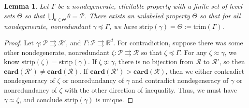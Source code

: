 \documentclass[12pt]{article}
\newcommand{\reals}{\mathbb{R}}
\renewcommand{\P}{\mathcal{P}}
\newcommand{\R}{\mathcal{R}}
\newcommand{\toto}{\rightrightarrows}
\newcommand{\strip}{\mathrm{strip}}
\newcommand{\card}{\textbf{card}}
\newtheorem{lemma}{Lemma}
\begin{document}
\begin{lemma}\label{lem:define-trim}
	Let $\Gamma$  be a nondegenerate, elicitable property with a finite set of level sets $\Theta$ so that $\bigcup_{\theta \in \Theta} \theta = \P$.
	There exists an unlabeled property $\Theta$ so that for all nondegenerate, nonredundant $\gamma \preceq \Gamma$, we have $\strip(\gamma) = \Theta := \text{trim}(\Gamma)$.
\end{lemma}

\begin{proof}
	Let $\gamma: \P \toto \R'$, and $\Gamma: \P \toto \reals^d$.
	For contradiction, suppose there was some other nondegenerate, nonredundant $\zeta: \P \toto \R$ so that $\zeta \preceq \Gamma$.
	For any $\zeta \approx \gamma$, we know $\strip(\zeta) = \strip(\gamma)$.
	If $\zeta \not \approx \gamma$, there is no bijection from $\R$ to $\R'$, so then $\card(\R') \neq \card(\R)$.
	If $\card(\R') > \card(\R)$, then we either contradict nondegeneracy of $\zeta$ or nonredundancy of $\gamma$ and contradict nondegeneracy of $\gamma$ or nonredundancy of $\zeta$ with the other direction of inequality.
	Thus, we must have $\gamma \approx \zeta$, and conclude $\strip(\gamma)$ is unique.


\end{proof}
\end{document}
